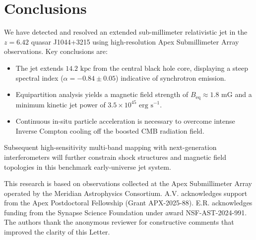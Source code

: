 \documentclass[twocolumn]{aastex631}
\begin{document}
\section{Conclusions} \label{sec:conclusions}

We have detected and resolved an extended sub-millimeter relativistic jet in the $z = 6.42$ quasar J1044+3215 using high-resolution Apex Submillimeter Array observations. Key conclusions are:

\begin{itemize}
\item The jet extends $14.2\text{ kpc}$ from the central black hole core, displaying a steep spectral index ($\alpha = -0.84 \pm 0.05$) indicative of synchrotron emission.
\item Equipartition analysis yields a magnetic field strength of $B_{\mathrm{eq}} \approx 1.8\text{ mG}$ and a minimum kinetic jet power of $3.5 \times 10^{45}\text{ erg s}^{-1}$.
\item Continuous in-situ particle acceleration is necessary to overcome intense Inverse Compton cooling off the boosted CMB radiation field.
\end{itemize}

Subsequent high-sensitivity multi-band mapping with next-generation interferometers will further constrain shock structures and magnetic field topologies in this benchmark early-universe jet system.

\begin{acknowledgments}
This research is based on observations collected at the Apex Submillimeter Array operated by the Meridian Astrophysics Consortium. A.V. acknowledges support from the Apex Postdoctoral Fellowship (Grant APX-2025-88). E.R. acknowledges funding from the Synapse Science Foundation under award NSF-AST-2024-991. The authors thank the anonymous reviewer for constructive comments that improved the clarity of this Letter.
\end{acknowledgments}


\end{document}
